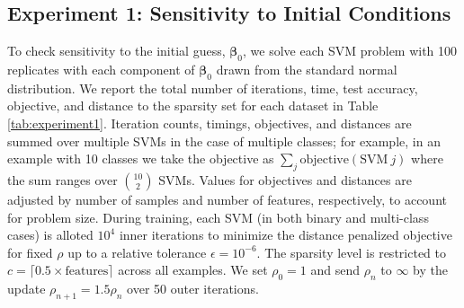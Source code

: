 \documentclass[11pt]{article}
\newcommand{\bbeta}{\boldsymbol{\beta}}
\begin{document}
\subsection*{Experiment 1: Sensitivity to Initial Conditions}

To check sensitivity to the initial guess, $\bbeta_{0}$, we solve each SVM problem with 100 replicates with each component of $\bbeta_{0}$ drawn from the standard normal distribution.
We report the total number of iterations, time, test accuracy, objective, and distance to the sparsity set for each dataset in Table \ref{tab:experiment1}.
Iteration counts, timings, objectives, and distances are summed over multiple SVMs in the case of multiple classes; for example, in an example with 10 classes we take the objective as $\sum_{j} \text{objective}(\text{SVM}~j)$ where the sum ranges over $\binom{10}{2}$ SVMs.
Values for objectives and distances are adjusted by number of samples and number of features, respectively, to account for problem size.
During training, each SVM (in both binary and multi-class cases) is alloted $10^{4}$ inner iterations to minimize the distance penalized objective for fixed $\rho$ up to a relative tolerance $\epsilon = 10^{-6}$.
The sparsity level is restricted to $c = \lceil 0.5 \times \text{features} \rceil$ across all examples.
We set $\rho_{0} = 1$ and send $\rho_{n}$ to $\infty$ by the update $\rho_{n+1} = 1.5 \rho_{n}$ over 50 outer iterations.
\end{document}
